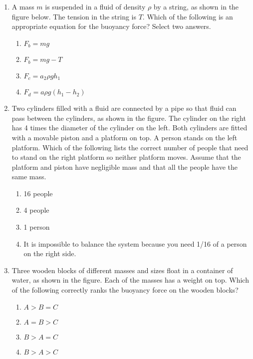 \documentclass{../../../oss-legalpaper}
\begin{document}
\begin{multicols}{2}
\begin{enumerate}[leftmargin=18pt,resume]
  \item A mass $m$ is suspended in a fluid of density $\rho$ by a string,
    as shown in the figure below. The tension in the string is $T$. Which of
    the following is an appropriate equation for the buoyancy force? Select
    two answers.
    \begin{center}
      \vspace{-.15in}
    \end{center}
    \begin{enumerate}[nosep,leftmargin=18pt,label=(\Alph*)]
    \item $F_b=mg$
    \item $F_b=mg-T$
    \item $F_c=a_2 \rho gh_1$
    \item $F_d=a\rho g(h_1-h_2)$
    \end{enumerate}
    \columnbreak
    
  \item Two cylinders filled with a fluid are connected by a pipe so that fluid
    can pass between the cylinders, as shown in the figure. The cylinder
    on the right has 4 times the diameter of the cylinder on the left. Both
    cylinders are fitted with a movable piston and a platform on top. A
    person stands on the left platform. Which of the following lists the
    correct number of people that need to stand on the right platform so
    neither platform moves. Assume that the platform and piston have
    negligible mass and that all the people have the same mass.

    \vspace{-.1in}
    \begin{enumerate}[nosep,leftmargin=18pt,label=(\Alph*)]
    \item \num{16} people
    \item \num{4} people
    \item \num{1} person
    \item It is impossible to balance the system because you need 1/16 of a
      person on the right side.
    \end{enumerate}
    \vspace{.7in}
    
  \item Three wooden blocks of different masses and sizes float in a container
    of water, as shown in the figure. Each of the masses has a weight on top.
    Which of the following correctly ranks the buoyancy force on the wooden
    blocks?
    \begin{center}
      \vspace{-.15in}
    \end{center}
    \begin{enumerate}[nosep,leftmargin=18pt,label=(\Alph*)]
    \item $A > B = C$
    \item $A = B > C$
    \item $B > A = C$
    \item $B > A > C$
    \end{enumerate}
    

\end{enumerate}
\end{multicols}
\end{document}
